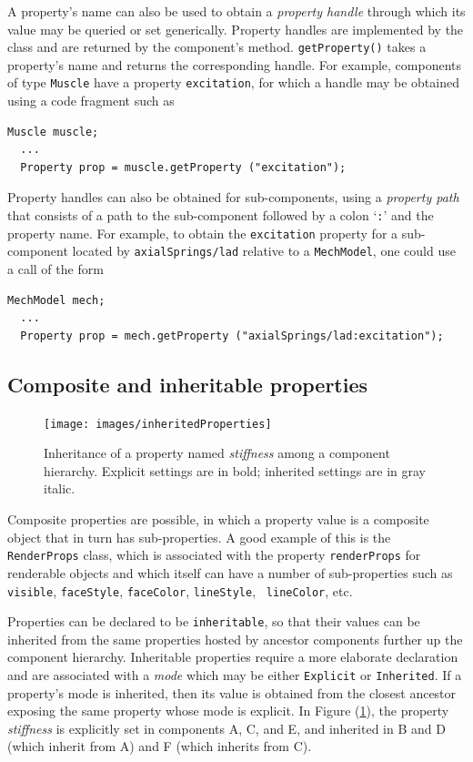 A property's name can also be used to obtain a {\it
property handle} through which its value may be queried or
set generically. Property handles are implemented by
the class  and are returned by
the component's
 method.
{\tt getProperty()} takes a property's name and returns the
corresponding handle. For example, components of type {\tt Muscle}
have a property {\tt excitation}, for which a handle
may be obtained using a code fragment such as
\begin{lstlisting}[]
  Muscle muscle; 
  ...
  Property prop = muscle.getProperty ("excitation");
\end{lstlisting}
Property handles can also be obtained for
sub-components, using a {\it property path} that consists
of a path to the sub-component followed by a colon
`{\tt :}' and the property name. For example,
to obtain the {\tt excitation} property for a sub-component
located by {\tt axialSprings/lad} relative to a {\tt MechModel},
one could use a call of the form
\begin{lstlisting}[]
  MechModel mech;
  ...
  Property prop = mech.getProperty ("axialSprings/lad:excitation");
\end{lstlisting}

\subsection{Composite and inheritable properties}
\label{CompositeInheritableProperties:sec}

\begin{figure}[t]
\begin{center}
 \texttt{[image: images/inheritedProperties]}
\end{center}
\caption{Inheritance of a property named {\it stiffness} among
a component hierarchy. Explicit settings are in bold; inherited settings
are in gray italic.}
\label{inheritedProperties:fig}
\end{figure}

Composite properties are possible, in which a property value is a
composite object that in turn has sub-properties. A good example of
this is the {\tt RenderProps} class, which is
associated with the property {\tt renderProps} for renderable objects
and which itself can have a number of sub-properties such as {\tt
visible}, {\tt faceStyle}, {\tt faceColor}, {\tt lineStyle}, {\tt
lineColor}, etc.

Properties can be declared to be {\tt inheritable}, so that their
values can be inherited from the same properties hosted by ancestor
components further up the component hierarchy. Inheritable properties
require a more elaborate declaration and are associated with a {\it
mode} which may be either {\tt Explicit} or {\tt Inherited}.  If a
property's mode is inherited, then its value is obtained from
the closest ancestor exposing the same property whose mode is
explicit. In Figure (\ref{inheritedProperties:fig}), the property {\it
stiffness} is explicitly set in components A, C, and E, and inherited
in B and D (which inherit from A) and F (which inherits from C).

